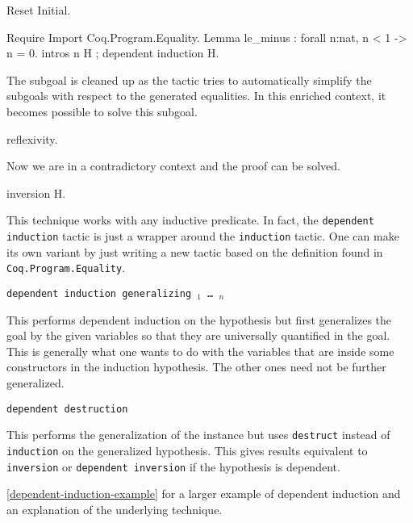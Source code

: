 \begin{coq_example*}
\begin{coq_eval}
Reset Initial.
\end{coq_eval}
\begin{coq_example}
Require Import Coq.Program.Equality.
Lemma le_minus : forall n:nat, n < 1 -> n = 0.
intros n H ; dependent induction H.
\end{coq_example}

The subgoal is cleaned up as the tactic tries to automatically
simplify the subgoals with respect to the generated equalities.
In this enriched context, it becomes possible to solve this subgoal.
\begin{coq_example}
reflexivity.
\end{coq_example}

Now we are in a contradictory context and the proof can be solved.
\begin{coq_example}
inversion H.
\end{coq_example}

This technique works with any inductive predicate.
In fact, the \texttt{dependent induction} tactic is just a wrapper around
the \texttt{induction} tactic. One can make its own variant by just
writing a new tactic based on the definition found in
\texttt{Coq.Program.Equality}.

\begin{Variants}
\item {\tt dependent induction {\ident} generalizing {\ident$_1$} \dots
    {\ident$_n$}}

  This performs dependent induction on the hypothesis {\ident} but first
  generalizes the goal by the given variables so that they are
  universally quantified in the goal. This is generally what one wants
  to do with the variables that are inside some constructors in the
  induction hypothesis. The other ones need not be further generalized.

\item {\tt dependent destruction {\ident}}

  This performs the generalization of the instance {\ident} but uses {\tt destruct}
  instead of {\tt induction} on the generalized hypothesis. This gives
  results equivalent to {\tt inversion} or {\tt dependent inversion} if
  the hypothesis is dependent.
\end{Variants}

\SeeAlso \ref{dependent-induction-example} for a larger example of
dependent induction and an explanation of the underlying technique.


\end{coq_example*}
